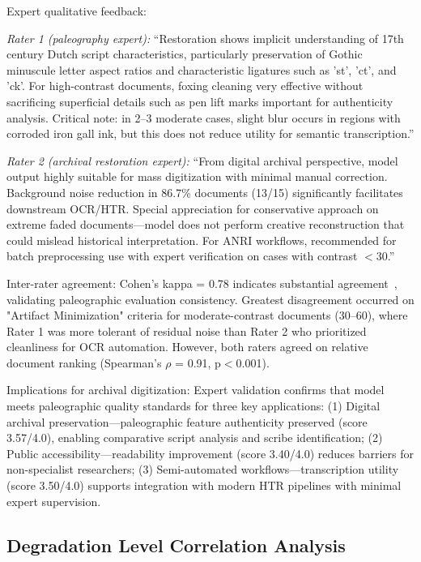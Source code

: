 \documentclass[journal]{IEEEtran}
\begin{document}
Expert qualitative feedback:

\textit{Rater 1 (paleography expert):} ``Restoration shows implicit understanding of 17th century Dutch script characteristics, particularly preservation of Gothic minuscule letter aspect ratios and characteristic ligatures such as 'st', 'ct', and 'ck'. For high-contrast documents, foxing cleaning very effective without sacrificing superficial details such as pen lift marks important for authenticity analysis. Critical note: in 2--3 moderate cases, slight blur occurs in regions with corroded iron gall ink, but this does not reduce utility for semantic transcription.''

\textit{Rater 2 (archival restoration expert):} ``From digital archival perspective, model output highly suitable for mass digitization with minimal manual correction. Background noise reduction in 86.7\% documents (13/15) significantly facilitates downstream OCR/HTR. Special appreciation for conservative approach on extreme faded documents---model does not perform creative reconstruction that could mislead historical interpretation. For ANRI workflows, recommended for batch preprocessing use with expert verification on cases with contrast $<$30.''

Inter-rater agreement: Cohen's kappa = 0.78 indicates substantial agreement~\cite{landis1977}, validating paleographic evaluation consistency. Greatest disagreement occurred on "Artifact Minimization" criteria for moderate-contrast documents (30--60), where Rater 1 was more tolerant of residual noise than Rater 2 who prioritized cleanliness for OCR automation. However, both raters agreed on relative document ranking (Spearman's $\rho$ = 0.91, p$<$0.001).

Implications for archival digitization: Expert validation confirms that model meets paleographic quality standards for three key applications: (1) Digital archival preservation---paleographic feature authenticity preserved (score 3.57/4.0), enabling comparative script analysis and scribe identification; (2) Public accessibility---readability improvement (score 3.40/4.0) reduces barriers for non-specialist researchers; (3) Semi-automated workflows---transcription utility (score 3.50/4.0) supports integration with modern HTR pipelines with minimal expert supervision.

\subsection{Degradation Level Correlation Analysis}
\end{document}
